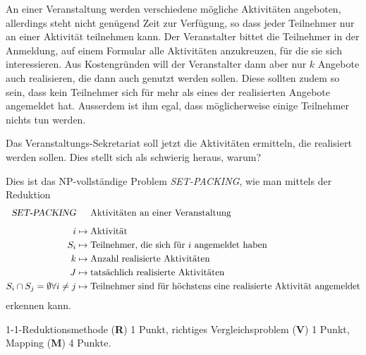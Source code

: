 An einer Veranstaltung werden verschiedene mögliche Aktivitäten angeboten,
allerdings steht nicht genügend Zeit zur Verfügung, so dass jeder
Teilnehmer nur an einer Aktivität teilnehmen kann.
Der Veranstalter bittet die Teilnehmer in der Anmeldung, auf einem
Formular alle Aktivitäten anzukreuzen, für die sie sich interessieren.
Aus Kostengründen will der Veranstalter dann aber nur $k$ Angebote
auch realisieren, die dann auch genutzt werden sollen.
Diese sollten zudem so sein, dass kein Teilnehmer sich für mehr als
eines der realisierten Angebote angemeldet hat.
Ausserdem ist ihm egal, dass möglicherweise einige Teilnehmer nichts tun
werden.

Das Veranstaltungs-Sekretariat soll jetzt die Aktivitäten ermitteln, 
die realisiert werden sollen.
Dies stellt sich als schwierig heraus, warum?

\begin{loesung}
Dies ist das NP-vollständige Problem \textsl{SET-PACKING}, wie man 
mittels der Reduktion
\begin{align*}
\textsl{SET-PACKING}&\phantom{\mathstrut\mapsto\mathstrut}\textrm{Aktivitäten an einer Veranstaltung}
\\[5pt]
i&\mapsto \textrm{Aktivität}
\\
S_i&\mapsto \textrm{Teilnehmer, die sich für $i$ angemeldet haben}
\\
k&\mapsto \textrm{Anzahl realisierte Aktivitäten}
\\
J&\mapsto \textrm{tatsächlich realisierte Aktivitäten}
\\
S_i\cap S_j=\emptyset\forall i\ne j
&\mapsto \textrm{Teilnehmer sind für höchstens eine realisierte Aktivität angemeldet}
\end{align*}
erkennen kann.
\end{loesung}

\begin{bewertung}
1-1-Reduktionsmethode ({\bf R}) 1 Punkt,
richtiges Vergleichsproblem ({\bf V}) 1 Punkt,
Mapping ({\bf M}) 4 Punkte.
\end{bewertung}

